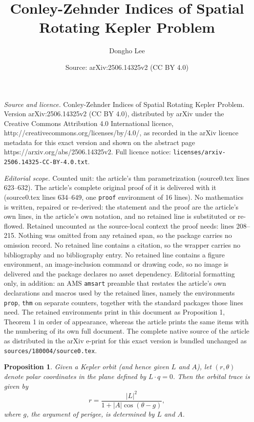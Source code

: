 \documentclass[10pt,a4paper]{amsart}
\title{Conley-Zehnder Indices of Spatial Rotating Kepler Problem}
\author{Dongho Lee}
\date{Source: arXiv:2506.14325v2 (CC BY 4.0)}
\newtheorem{prop}{Proposition}
\begin{document}
\maketitle

\noindent\emph{Source and licence.} Conley-Zehnder Indices of Spatial Rotating Kepler Problem. Version arXiv:2506.14325v2 (CC BY 4.0), distributed by arXiv under the Creative Commons Attribution 4.0 International licence, http://creativecommons.org/licenses/by/4.0/, as recorded in the arXiv licence metadata for this exact version and shown on the abstract page https://arxiv.org/abs/2506.14325v2. Full licence notice: \texttt{licenses/arxiv-2506.14325-CC-BY-4.0.txt}.\par\smallskip

\noindent\textit{Editorial scope.} Counted unit: the article's thm parametrization (source0.tex lines 623--632). The article's complete original proof of it is delivered with it (source0.tex lines 634--649, one \texttt{proof} environment of 16 lines). No mathematics is written, repaired or re-derived: the statement and the proof are the article's own lines, in the article's own notation, and no retained line is substituted or re-flowed.  Retained uncounted as the source-local context the proof needs: lines 208--215.  Nothing was omitted from any retained span, so the package carries no omission record.  No retained line contains a citation, so the wrapper carries no bibliography and no bibliography entry.  No retained line contains a figure environment, an image-inclusion command or drawing code, so no image is delivered and the package declares no asset dependency.  Editorial formatting only, in addition: an AMS \texttt{amsart} preamble that restates the article's own declarations and macros used by the retained lines, namely the environments \texttt{prop}, \texttt{thm} on separate counters, together with the standard packages those lines need.  The retained environments print in this document as Proposition 1, Theorem 1 in order of appearance, whereas the article prints the same items with the numbering of its own full document.  The complete native source of the article as distributed in the arXiv e-print for this exact version is bundled unchanged as \texttt{sources/180004/source0.tex}.
\begin{prop}\label{Proposition - ELA Kepler orbit}
	Given a Kepler orbit (and hence given $L$ and $A$), let $(r,\theta)$ denote polar coordinates in the plane defined by $L \cdot  q = 0$.
	Then the orbital trace is given by
		$$
		r = \frac{|L|^2}{1+|A|\cos(\theta-g)},
		$$
	where $g$, the \emph{argument of perigee}, is determined by $L$ and $A$.
\end{prop}
\end{document}
